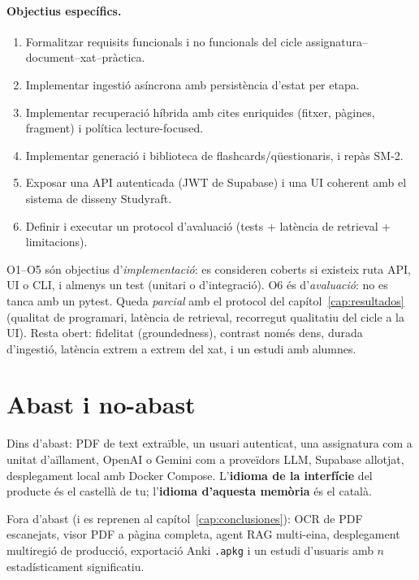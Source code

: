 \paragraph{Objectius específics.}
\begin{enumerate}[label=O\arabic*.]
  \item Formalitzar requisits funcionals i no funcionals del cicle assignatura--document--xat--pràctica.
  \item Implementar ingestió asíncrona amb persistència d'estat per etapa.
  \item Implementar recuperació híbrida amb cites enriquides (fitxer, pàgines, fragment) i política lecture-focused.
  \item Implementar generació i biblioteca de flashcards/qüestionaris, i repàs SM-2.
  \item Exposar una API autenticada (JWT de Supabase) i una UI coherent amb el sistema de disseny Studyraft.
  \item Definir i executar un protocol d'avaluació (tests + latència de retrieval + limitacions).
\end{enumerate}

O1--O5 són objectius d'\emph{implementació}: es consideren coberts si existeix ruta API, UI o CLI, i almenys un test (unitari o d'integració). O6 és d'\emph{avaluació}: no es tanca amb un pytest. Queda \emph{parcial} amb el protocol del capítol~\ref{cap:resultados} (qualitat de programari, latència de retrieval, recorregut qualitatiu del cicle a la UI). Resta obert: fidelitat (groundedness), contrast només dens, durada d'ingestió, latència extrem a extrem del xat, i un estudi amb alumnes.

\section{Abast i no-abast}

Dins d'abast: PDF de text extraïble, un usuari autenticat, una assignatura com a unitat d'aïllament, OpenAI o Gemini com a proveïdors LLM, Supabase allotjat, desplegament local amb Docker Compose. L'\textbf{idioma de la interfície} del producte és el castellà de tu; l'\textbf{idioma d'aquesta memòria} és el català.

Fora d'abast (i es reprenen al capítol~\ref{cap:conclusiones}): OCR de PDF escanejats, visor PDF a pàgina completa, agent RAG multi-eina, desplegament multiregió de producció, exportació Anki \texttt{.apkg} i un estudi d'usuaris amb $n$ estadísticament significatiu.


